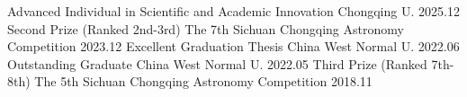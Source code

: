 

\begin{cvhonors}

  \cvhonor
    {Advanced Individual in Scientific and Academic Innovation} %
    {Chongqing U.} %
    {} %
    {2025.12} %
\cvhonor
    {Second Prize (Ranked 2nd-3rd)} %
    {The 7th Sichuan Chongqing Astronomy Competition} %
    {} %
    {2023.12} %
  \cvhonor
    {Excellent Graduation Thesis} %
    {China West Normal U.} %
    {} %
    {2022.06} %
  \cvhonor
    {Outstanding Graduate} %
    {China West Normal U.} %
    {} %
    {2022.05} %
  \cvhonor
    {Third Prize (Ranked 7th-8th)} %
    {The 5th Sichuan Chongqing Astronomy Competition} %
    {} %
    {2018.11} %

\end{cvhonors}


